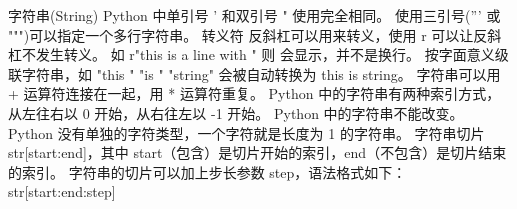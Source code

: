 字符串(String)
Python 中单引号 ' 和双引号 " 使用完全相同。
使用三引号(''' 或 """)可以指定一个多行字符串。
转义符 \。
反斜杠可以用来转义，使用 r 可以让反斜杠不发生转义。 如 r"this is a line with \n" 则 \n 会显示，并不是换行。
按字面意义级联字符串，如 "this " "is " "string" 会被自动转换为 this is string。
字符串可以用 + 运算符连接在一起，用 * 运算符重复。
Python 中的字符串有两种索引方式，从左往右以 0 开始，从右往左以 -1 开始。
Python 中的字符串不能改变。
Python 没有单独的字符类型，一个字符就是长度为 1 的字符串。
字符串切片 str[start:end]，其中 start（包含）是切片开始的索引，end（不包含）是切片结束的索引。
字符串的切片可以加上步长参数 step，语法格式如下：str[start:end:step]

